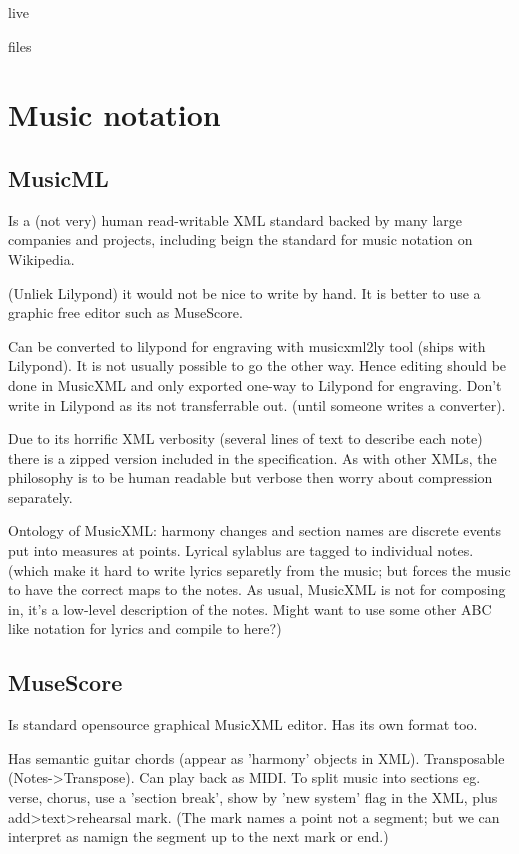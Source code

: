 \documentclass[oneside,english]{scrbook}
\begin{document}
live

files



\chapter{Music notation}

\section{MusicML}
Is a (not very) human read-writable XML standard backed by many large companies and projects, including beign the standard for music notation on Wikipedia.

(Unliek Lilypond) it would not be nice to write by hand. It is better to use a graphic free editor such as MuseScore.

Can be converted to lilypond for engraving with musicxml2ly tool (ships with Lilypond). It is not usually possible to go the other way. Hence editing should be done in MusicXML and only exported one-way to Lilypond for engraving.  Don't write in Lilypond as its not transferrable out. (until someone writes a converter).

Due to its horrific XML verbosity (several lines of text to describe each note) there is a zipped version included in the specification. As with other XMLs, the philosophy is to be human readable but verbose then worry about compression separately.


Ontology of MusicXML: harmony changes and section names are discrete events put into measures at points.  Lyrical sylablus are tagged to individual notes. (which make it hard to write lyrics separetly from the music; but forces the music to have the correct maps to the notes.  As usual, MusicXML is not for composing in, it's a low-level description of the notes. Might want to use some other ABC like notation for lyrics and compile to here?)

\section{MuseScore}
Is standard opensource graphical MusicXML editor. Has its own format too.   

Has semantic guitar chords (appear as 'harmony' objects in XML). Transposable (Notes->Transpose). Can play back as MIDI. To split music into sections eg. verse, chorus, use a 'section break', show by 'new system' flag in the XML, plus add>text>rehearsal mark. (The mark names a point not a segment; but we can interpret as namign the segment up to the next mark or end.)
\end{document}
